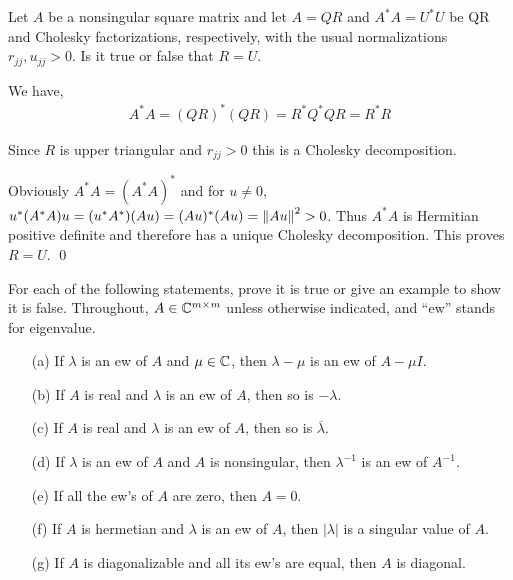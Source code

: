 \documentclass[10pt]{article}
\begin{document}
\begin{problem}[Exercise 23.1]
Let \( A \) be a nonsingular square matrix and let \( A=QR \) and \( A^*A=U^*U \) be QR and Cholesky factorizations, respectively, with the usual normalizations \( r_{jj},u_{jj}>0 \). Is it true or false that \( R=U \).
\end{problem}

\begin{solution}[Solution]
We have, 
\begin{align*}
    A^*A = (QR)^*(QR) = R^*Q^*QR = R^*R
\end{align*}

Since \( R \) is upper triangular and \( r_{jj} > 0 \) this is a Cholesky decomposition. 

Obviously \( A^*A = (A^*A)^* \) and for \( u\neq 0 \), \( u^*(A^*A)u = (u^*A^*)(Au) = (Au)^*(Au) = \left\lVert Au\right\rVert^2 > 0 \). Thus \( A^*A \) is Hermitian positive definite and therefore has a unique Cholesky decomposition. This proves \( R=U \). \qed
\end{solution}

\begin{problem}[Exercise 24.1]
For each of the following statements, prove it is true or give an example to show it is false. Throughout, \( A\in\mathbb{C}^{m\times m} \) unless otherwise indicated, and ``ew'' stands for eigenvalue.
    \begin{enumerate}
        \item[(a)] If \( \lambda \) is an ew of \( A \) and \( \mu\in\mathbb{C} \), then \( \lambda-\mu \) is an ew of \( A-\mu I \).
        \item[(b)] If \( A \) is real and \( \lambda \) is an ew of \( A \), then so is \( -\lambda \).
        \item[(c)] If \( A \) is real and \( \lambda \) is an ew of \( A \), then so is \( \overline{\lambda} \). 
        \item[(d)] If \( \lambda \) is an ew of \( A \) and \( A \) is nonsingular, then \( \lambda^{-1} \) is an ew of \( A^{-1} \).
        \item[(e)] If all the ew's of \( A \) are zero, then \( A=0 \).
        \item[(f)] If \( A \) is hermetian and \( \lambda \) is an ew of \( A \), then \( |\lambda| \) is a singular value of \( A \).
        \item[(g)] If \( A \) is diagonalizable and all its ew's are equal, then \( A \) is diagonal.
   \end{enumerate}
\end{problem}
\end{document}
